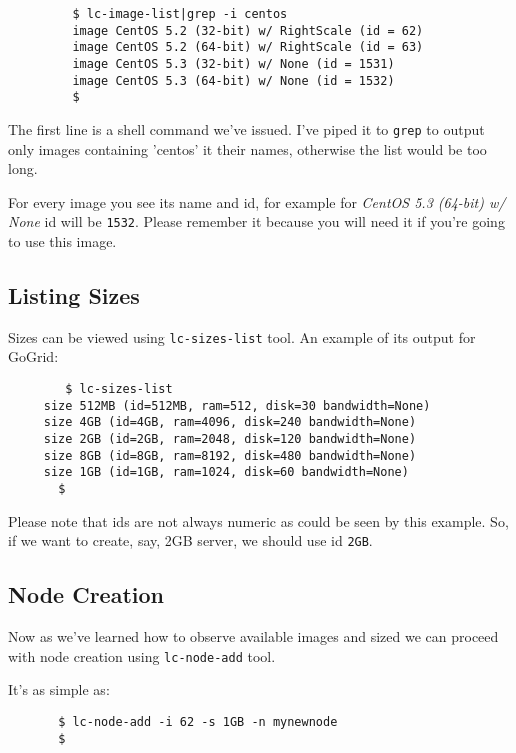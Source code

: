 \documentclass[a4paper]{report}
\begin{document}
            \begin{verbatim}
         $ lc-image-list|grep -i centos
         image CentOS 5.2 (32-bit) w/ RightScale (id = 62)
         image CentOS 5.2 (64-bit) w/ RightScale (id = 63)
         image CentOS 5.3 (32-bit) w/ None (id = 1531)
         image CentOS 5.3 (64-bit) w/ None (id = 1532)
         $
            \end{verbatim}

            The first line is a shell command we've issued. I've piped it to
         \texttt{grep} to output only images containing 'centos' it their names,
         otherwise the list would be too long. 

         For every image you see its name and id, for example for 
        \textit{CentOS 5.3 (64-bit) w/ None} id will be \texttt{1532}. Please
        remember it because you will need it if you're going to use this
        image.

        \subsection{Listing Sizes}
        Sizes can be viewed using \texttt{lc-sizes-list} tool. An example of its
        output for GoGrid:

        \begin{verbatim}
        $ lc-sizes-list
     size 512MB (id=512MB, ram=512, disk=30 bandwidth=None)
     size 4GB (id=4GB, ram=4096, disk=240 bandwidth=None)
     size 2GB (id=2GB, ram=2048, disk=120 bandwidth=None)
     size 8GB (id=8GB, ram=8192, disk=480 bandwidth=None)
     size 1GB (id=1GB, ram=1024, disk=60 bandwidth=None)
       $
       \end{verbatim}

       Please note that ids are not always numeric as could be seen by this example.
       So, if we want to create, say, 2GB server, we should use id \texttt{2GB}.

       \subsection{Node Creation}
       Now as we've learned how to observe available images and sized we can proceed
       with node creation using \texttt{lc-node-add} tool.

       It's as simple as:

       \begin{verbatim}
       $ lc-node-add -i 62 -s 1GB -n mynewnode
       $
       \end{verbatim}
\end{document}
